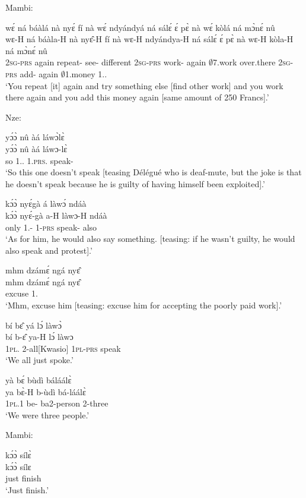 \noindent Mambi:

\begin{exe}[(C234)]  
\exC\label{247} 
  \glll wɛ́ ná báàlá nà nyɛ́ fí nà wɛ́ ndyándyá ná sálɛ́ ɛ́ pɛ̀ nà wɛ́ kòlá ná mɔ̀nɛ́ nû \\
      wɛ-H ná báàla-H nà nyɛ̂-H fí nà wɛ-H ndyándya-H ná sálɛ́ ɛ́ pɛ̀ nà wɛ-H kòla-H ná mɔ̀nɛ́ nû \\
         2\textsc{sg}-\textsc{prs} again repeat-{\R} {\CONJ} see-{\R} different {\CONJ} 2\textsc{sg}-\textsc{prs} work-{\R} again $\emptyset$7.work {\LOC} over.there {\CONJ} 2\textsc{sg}-\textsc{prs} add-{\R} again $\emptyset$1.money 1.{\DEM}.{\PROX} \\
    \trans `You repeat [it] again and try something else [find other work] and you work there again and you add this money again [same amount of 250 Francs].'
\end{exe}

\noindent Nze:

\begin{exe}[(C234)]  
\exC\label{248} 
  \glll yɔ́ɔ̀ nû àá láwɔ̀lɛ̀\\
       yɔ́ɔ̀ nû àá láwɔ-lɛ̀ \\
         so 1.{\DEM}.{\PROX} 1.\textsc{prs}.{\NEG} speak-{\NEG} \\
    \trans `So this one doesn't speak [teasing Délégué who is deaf-mute, but the joke is that he doesn't speak because he is guilty of having himself been exploited].'
 
\exC\label{249}
  \glll  kɔ́ɔ̀ nyɛ́gà á làwɔ́ ndáà\\
         kɔ́ɔ̀ nyɛ́-gà a-H làwɔ-H ndáà \\
         only  1.{\SBJ}-{\CONTR} 1-\textsc{prs} speak-{\R} also \\
    \trans `As for him, he would also say something. [teasing: if he wasn't guilty, he would also speak and protest].'
 
\exC\label{250} 
  \glll  mhm dzámɛ́ ngá nyɛ̂ \\
       mhm dzámɛ́ ngá nyɛ̂ \\
         {\EXCL} excuse {\PL}  1.{\OBJ} \\
    \trans `Mhm, excuse him [teasing: excuse him for accepting the poorly paid work].'
 
\exC\label{251}
  \glll bí bɛ̂ yá lɔ́ làwɔ̀ \\
      bí b-ɛ̂ ya-H lɔ́ làwɔ \\
        1\textsc{pl}.{\SBJ}  2-all[Kwasio] 1\textsc{pl}-\textsc{prs} {\RETRO}  speak \\
    \trans `We all just spoke.'
 
\exC\label{252} 
  \glll yà bɛ́ bùdì báláálɛ̀ \\
       ya bɛ̀-H b-ùdì bá-láálɛ̀ \\
        1\textsc{pl}.{\PST}1 be-{\R} ba2-person 2-three  \\
    \trans `We were three people.'
\end{exe}

\noindent Mambi:

\begin{exe}[(C234)]  
\exC\label{253} 
  \glll  kɔ́ɔ̀ sílɛ̀ \\
        kɔ́ɔ̀ sílɛ \\
       just finish   \\
    \trans `Just finish.'
\end{exe}
